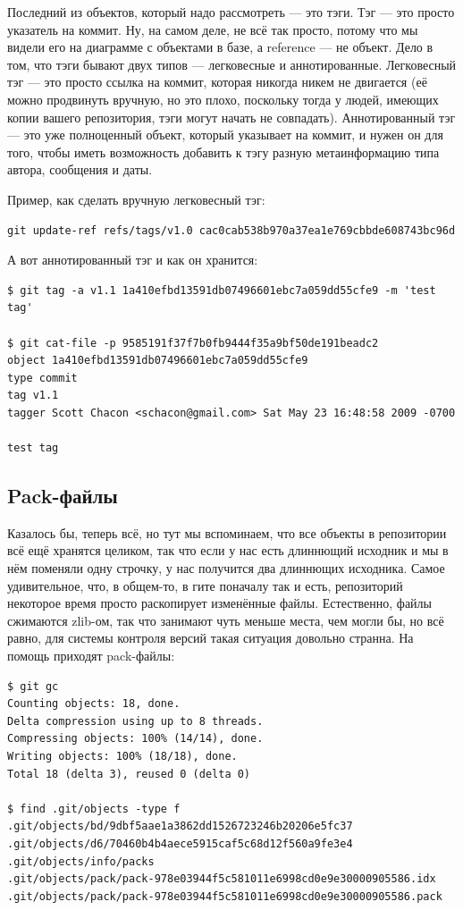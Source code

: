 \documentclass[a5paper]{article}
\begin{document}
Последний из объектов, который надо рассмотреть --- это тэги. Тэг --- это просто указатель на коммит. Ну, на самом деле, не всё так просто, потому что мы видели его на диаграмме с объектами в базе, а reference --- не объект. Дело в том, что тэги бывают двух типов --- легковесные и аннотированные. Легковесный тэг --- это просто ссылка на коммит, которая никогда никем не двигается (её можно продвинуть вручную, но это плохо, поскольку тогда у людей, имеющих копии вашего репозитория, тэги могут начать не совпадать). Аннотированный тэг --- это уже полноценный объект, который указывает на коммит, и нужен он для того, чтобы иметь возможность добавить к тэгу разную метаинформацию типа автора, сообщения и даты.

Пример, как сделать вручную легковесный тэг:
\begin{verbatim}
git update-ref refs/tags/v1.0 cac0cab538b970a37ea1e769cbbde608743bc96d
\end{verbatim}

А вот аннотированный тэг и как он хранится:
\begin{verbatim}
$ git tag -a v1.1 1a410efbd13591db07496601ebc7a059dd55cfe9 -m 'test tag'

$ git cat-file -p 9585191f37f7b0fb9444f35a9bf50de191beadc2
object 1a410efbd13591db07496601ebc7a059dd55cfe9
type commit
tag v1.1
tagger Scott Chacon <schacon@gmail.com> Sat May 23 16:48:58 2009 -0700

test tag
\end{verbatim}

\subsection{Pack-файлы}

Казалось бы, теперь всё, но тут мы вспоминаем, что все объекты в репозитории всё ещё хранятся целиком, так что если у нас есть длиннющий исходник и мы в нём поменяли одну строчку, у нас получится два длиннющих исходника. Самое удивительное, что, в общем-то, в гите поначалу так и есть, репозиторий некоторое время просто раскопирует изменённые файлы. Естественно, файлы сжимаются zlib-ом, так что занимают чуть меньше места, чем могли бы, но всё равно, для системы контроля версий такая ситуация довольно странна. На помощь приходят pack-файлы:

\begin{verbatim}
$ git gc
Counting objects: 18, done.
Delta compression using up to 8 threads.
Compressing objects: 100% (14/14), done.
Writing objects: 100% (18/18), done.
Total 18 (delta 3), reused 0 (delta 0)

$ find .git/objects -type f
.git/objects/bd/9dbf5aae1a3862dd1526723246b20206e5fc37
.git/objects/d6/70460b4b4aece5915caf5c68d12f560a9fe3e4
.git/objects/info/packs
.git/objects/pack/pack-978e03944f5c581011e6998cd0e9e30000905586.idx
.git/objects/pack/pack-978e03944f5c581011e6998cd0e9e30000905586.pack
\end{verbatim}
\end{document}
